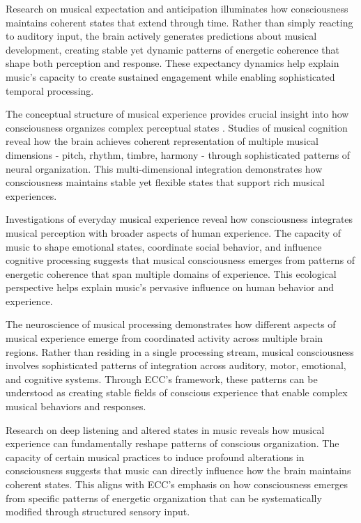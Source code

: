Research on musical expectation and anticipation \cite{Huron2006} illuminates how consciousness maintains coherent states that extend through time. Rather than simply reacting to auditory input, the brain actively generates predictions about musical development, creating stable yet dynamic patterns of energetic coherence that shape both perception and response. These expectancy dynamics help explain music's capacity to create sustained engagement while enabling sophisticated temporal processing.

The conceptual structure of musical experience provides crucial insight into how consciousness organizes complex perceptual states \cite{Zbikowski2002}. Studies of musical cognition reveal how the brain achieves coherent representation of multiple musical dimensions - pitch, rhythm, timbre, harmony - through sophisticated patterns of neural organization. This multi-dimensional integration demonstrates how consciousness maintains stable yet flexible states that support rich musical experiences.

Investigations of everyday musical experience \cite{DeNora2000} reveal how consciousness integrates musical perception with broader aspects of human experience. The capacity of music to shape emotional states, coordinate social behavior, and influence cognitive processing suggests that musical consciousness emerges from patterns of energetic coherence that span multiple domains of experience. This ecological perspective helps explain music's pervasive influence on human behavior and experience.

The neuroscience of musical processing \cite{Peretz2005} demonstrates how different aspects of musical experience emerge from coordinated activity across multiple brain regions. Rather than residing in a single processing stream, musical consciousness involves sophisticated patterns of integration across auditory, motor, emotional, and cognitive systems. Through ECC's framework, these patterns can be understood as creating stable fields of conscious experience that enable complex musical behaviors and responses.

Research on deep listening and altered states in music \cite{Becker2004} reveals how musical experience can fundamentally reshape patterns of conscious organization. The capacity of certain musical practices to induce profound alterations in consciousness suggests that music can directly influence how the brain maintains coherent states. This aligns with ECC's emphasis on how consciousness emerges from specific patterns of energetic organization that can be systematically modified through structured sensory input.


